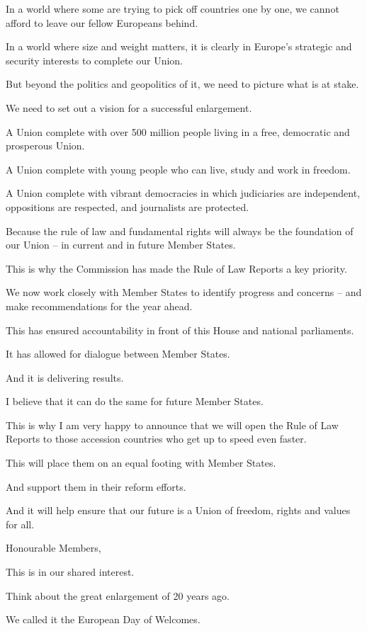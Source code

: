 \documentclass[a4paper,11pt]{article}
\begin{document}
In a world where some are trying to pick off countries one by one, we cannot afford to leave our fellow Europeans behind.

In a world where size and weight matters, it is clearly in Europe's strategic and security interests to complete our Union.

But beyond the politics and geopolitics of it, we need to picture what is at stake.

We need to set out a vision for a successful enlargement.

A Union complete with over 500 million people living in a free, democratic and prosperous Union.

A Union complete with young people who can live, study and work in freedom.

A Union complete with vibrant democracies in which judiciaries are independent, oppositions are respected, and journalists are protected.

Because the rule of law and fundamental rights will always be the foundation of our Union – in current and in future Member States.

This is why the Commission has made the Rule of Law Reports a key priority.

We now work closely with Member States to identify progress and concerns – and make recommendations for the year ahead.

This has ensured accountability in front of this House and national parliaments.

It has allowed for dialogue between Member States. 

And it is delivering results.

I believe that it can do the same for future Member States.

This is why I am very happy to announce that we will open the Rule of Law Reports to those accession countries who get up to speed even faster.

This will place them on an equal footing with Member States.

And support them in their reform efforts.

And it will help ensure that our future is a Union of freedom, rights and values for all.

 

Honourable Members,

This is in our shared interest.

Think about the great enlargement of 20 years ago.

We called it the European Day of Welcomes.
\end{document}
